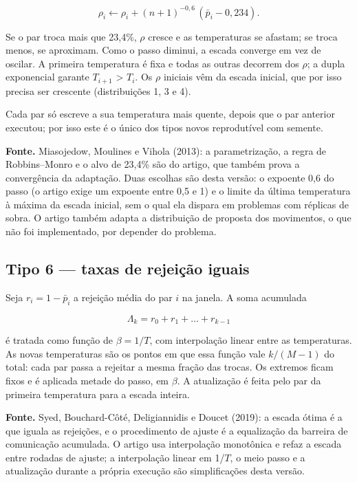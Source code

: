 \documentclass[10pt,a4paper]{article}
\begin{document}
\[
\rho_i \leftarrow \rho_i + (n+1)^{-0{,}6}\,(\bar{p}_i - 0{,}234).
\]

Se o par troca mais que 23,4\%, $\rho$ cresce e as temperaturas se afastam; se troca menos, se aproximam. Como o passo diminui, a escada converge em vez de oscilar. A primeira temperatura é fixa e todas as outras decorrem dos $\rho$; a dupla exponencial garante $T_{i+1}$ > $T_{i}$. Os $\rho$ iniciais vêm da escada inicial, que por isso precisa ser crescente (distribuições 1, 3 e 4).

Cada par só escreve a sua temperatura mais quente, depois que o par anterior executou; por isso este é o único dos tipos novos reprodutível com semente.

\begin{fonte}
\textbf{Fonte.} Miasojedow, Moulines e Vihola (2013): a parametrização, a regra de Robbins–Monro e o alvo de 23,4\% são do artigo, que também prova a convergência da adaptação. Duas escolhas são desta versão: o expoente 0,6 do passo (o artigo exige um expoente entre 0,5 e 1) e o limite da última temperatura à máxima da escada inicial, sem o qual ela dispara em problemas com réplicas de sobra. O artigo também adapta a distribuição de proposta dos movimentos, o que não foi implementado, por depender do problema.
\end{fonte}

\subsection*{Tipo 6 — taxas de rejeição iguais}

Seja $r_i = 1 - \bar{p}_i$ a rejeição média do par $i$ na janela. A soma acumulada

\[
\Lambda_k = r_0 + r_1 + \dots + r_{k-1}
\]

é tratada como função de $\beta = 1/T$, com interpolação linear entre as temperaturas. As novas temperaturas são os pontos em que essa função vale $k/(M-1)$ do total: cada par passa a rejeitar a mesma fração das trocas. Os extremos ficam fixos e é aplicada metade do passo, em $\beta$. A atualização é feita pelo par da primeira temperatura para a escada inteira.

\begin{fonte}
\textbf{Fonte.} Syed, Bouchard-Côté, Deligiannidis e Doucet (2019): a escada ótima é a que iguala as rejeições, e o procedimento de ajuste é a equalização da barreira de comunicação acumulada. O artigo usa interpolação monotônica e refaz a escada entre rodadas de ajuste; a interpolação linear em 1/$T$, o meio passo e a atualização durante a própria execução são simplificações desta versão.
\end{fonte}
\end{document}
